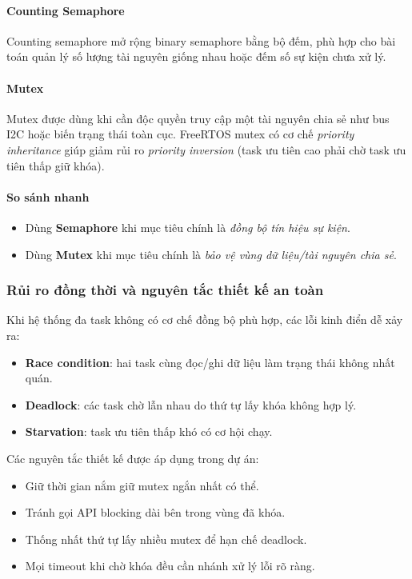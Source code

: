 \paragraph{Counting Semaphore}
Counting semaphore mở rộng binary semaphore bằng bộ đếm, phù hợp cho bài toán quản lý số lượng tài nguyên giống nhau hoặc đếm số sự kiện chưa xử lý.

\paragraph{Mutex}
Mutex được dùng khi cần độc quyền truy cập một tài nguyên chia sẻ như bus I2C hoặc biến trạng thái toàn cục. FreeRTOS mutex có cơ chế \textit{priority inheritance} giúp giảm rủi ro \textit{priority inversion} (task ưu tiên cao phải chờ task ưu tiên thấp giữ khóa).

\paragraph{So sánh nhanh}
\begin{itemize}
    \item Dùng \textbf{Semaphore} khi mục tiêu chính là \textit{đồng bộ tín hiệu sự kiện}.
    \item Dùng \textbf{Mutex} khi mục tiêu chính là \textit{bảo vệ vùng dữ liệu/tài nguyên chia sẻ}.
\end{itemize}

\subsubsection*{Rủi ro đồng thời và nguyên tắc thiết kế an toàn}

Khi hệ thống đa task không có cơ chế đồng bộ phù hợp, các lỗi kinh điển dễ xảy ra:
\begin{itemize}
    \item \textbf{Race condition}: hai task cùng đọc/ghi dữ liệu làm trạng thái không nhất quán.
    \item \textbf{Deadlock}: các task chờ lẫn nhau do thứ tự lấy khóa không hợp lý.
    \item \textbf{Starvation}: task ưu tiên thấp khó có cơ hội chạy.
\end{itemize}

Các nguyên tắc thiết kế được áp dụng trong dự án:
\begin{itemize}
    \item Giữ thời gian nắm giữ mutex ngắn nhất có thể.
    \item Tránh gọi API blocking dài bên trong vùng đã khóa.
    \item Thống nhất thứ tự lấy nhiều mutex để hạn chế deadlock.
    \item Mọi timeout khi chờ khóa đều cần nhánh xử lý lỗi rõ ràng.
\end{itemize}

